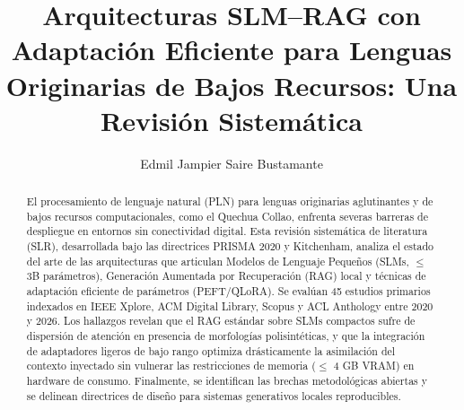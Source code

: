 
\title{Arquitecturas SLM--RAG con Adaptación Eficiente para Lenguas Originarias de Bajos Recursos: Una Revisión Sistemática}

\author{Edmil Jampier Saire Bustamante\orcidID{[0000-0000-0000-0000]}}



\maketitle

\begin{abstract}
El procesamiento de lenguaje natural (PLN) para lenguas originarias aglutinantes y de bajos recursos computacionales, como el Quechua Collao, enfrenta severas barreras de despliegue en entornos sin conectividad digital. Esta revisión sistemática de literatura (SLR), desarrollada bajo las directrices PRISMA 2020 y Kitchenham, analiza el estado del arte de las arquitecturas que articulan Modelos de Lenguaje Pequeños (SLMs, $\le$ 3B parámetros), Generación Aumentada por Recuperación (RAG) local y técnicas de adaptación eficiente de parámetros (PEFT/QLoRA). Se evalúan 45 estudios primarios indexados en IEEE Xplore, ACM Digital Library, Scopus y ACL Anthology entre 2020 y 2026. Los hallazgos revelan que el RAG estándar sobre SLMs compactos sufre de dispersión de atención en presencia de morfologías polisintéticas, y que la integración de adaptadores ligeros de bajo rango optimiza drásticamente la asimilación del contexto inyectado sin vulnerar las restricciones de memoria ($\le$ 4 GB VRAM) en hardware de consumo. Finalmente, se identifican las brechas metodológicas abiertas y se delinean directrices de diseño para sistemas generativos locales reproducibles.

\end{abstract}
